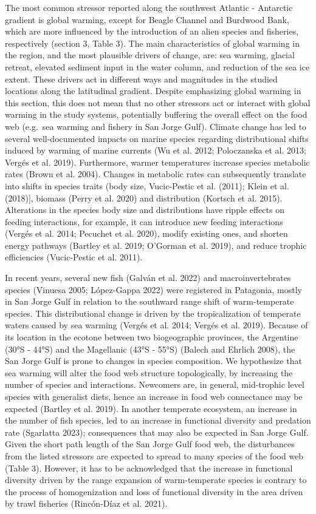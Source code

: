\documentclass[
]{article}
\begin{document}
The most common stressor reported along the southwest Atlantic -
Antarctic gradient is global warming, except for Beagle Channel and
Burdwood Bank, which are more influenced by the introduction of an alien
species and fisheries, respectively (section 3, Table 3). The main
characteristics of global warming in the region, and the most plausible
drivers of change, are: sea warming, glacial retreat, elevated sediment
input in the water column, and reduction of the sea ice extent. These
drivers act in different ways and magnitudes in the studied locations
along the latitudinal gradient. Despite emphasizing global warming in
this section, this does not mean that no other stressors act or interact
with global warming in the study systems, potentially buffering the
overall effect on the food web (e.g.~sea warming and fishery in San
Jorge Gulf). Climate change has led to several well-documented impacts
on marine species regarding distributional shifts induced by warming of
marine currents (Wu et al. 2012; Poloczanska et al. 2013; Vergés et al.
2019). Furthermore, warmer temperatures increase species metabolic rates
(Brown et al. 2004). Changes in metabolic rates can subsequently
translate into shifts in species traits (body size, Vucic-Pestic et al.
(2011); Klein et al. (2018){]}, biomass (Perry et al. 2020) and
distribution (Kortsch et al. 2015). Alterations in the species body size
and distributions have ripple effects on feeding interactions, for
example, it can introduce new feeding interactions (Vergés et al. 2014;
Pecuchet et al. 2020), modify existing ones, and shorten energy pathways
(Bartley et al. 2019; O'Gorman et al. 2019), and reduce trophic
efficiencies (Vucic-Pestic et al. 2011).

In recent years, several new fish (Galván et al. 2022) and
macroinvertebrates species (Vinuesa 2005; López-Gappa 2022) were
registered in Patagonia, mostly in San Jorge Gulf in relation to the
southward range shift of warm-temperate species. This distributional
change is driven by the tropicalization of temperate waters caused by
sea warming (Vergés et al. 2014; Vergés et al. 2019). Because of its
location in the ecotone between two biogeographic provinces, the
Argentine (30°S - 44°S) and the Magellanic (43°S - 55°S) (Balech and
Ehrlich 2008), the San Jorge Gulf is prone to changes in species
composition. We hypothesize that sea warming will alter the food web
structure topologically, by increasing the number of species and
interactions. Newcomers are, in general, mid-trophic level species with
generalist diets, hence an increase in food web connectance may be
expected (Bartley et al. 2019). In another temperate ecosystem, an
increase in the number of fish species, led to an increase in functional
diversity and predation rate (Sgarlatta 2023); consequences that may
also be expected in San Jorge Gulf. Given the short path length of the
San Jorge Gulf food web, the disturbances from the listed stressors are
expected to spread to many species of the food web (Table 3). However,
it has to be acknowledged that the increase in functional diversity
driven by the range expansion of warm-temperate species is contrary to
the process of homogenization and loss of functional diversity in the
area driven by trawl fisheries (Rincón-Díaz et al. 2021).
\end{document}
